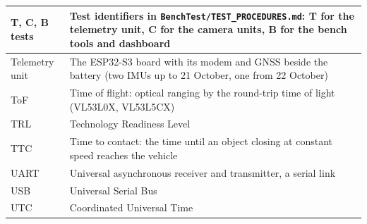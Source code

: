 \documentclass[a4paper,11pt]{report}
\begin{document}
{{\begin{longtable}{|>{\raggedright\arraybackslash}p{2.6cm}|>{\raggedright\arraybackslash}p{11.2cm}|}
T, C, B tests & Test identifiers in \texttt{BenchTest/\allowbreak{}TEST\_\allowbreak{}PROCEDURES.md}: T for the telemetry unit, C for the camera units, B for the bench tools and dashboard \\ \hline
Telemetry unit & The ESP32-S3 board with its modem and GNSS beside the battery (two IMUs up to 21 October, one from 22 October) \\ \hline
ToF & Time of flight: optical ranging by the round-trip time of light (VL53L0X, VL53L5CX) \\ \hline
TRL & Technology Readiness Level \\ \hline
TTC & Time to contact: the time until an object closing at constant speed reaches the vehicle \\ \hline
UART & Universal asynchronous receiver and transmitter, a serial link \\ \hline
USB & Universal Serial Bus \\ \hline
UTC & Coordinated Universal Time \\ \hline
\end{longtable}
}

\newpage
\listoffigures

\newpage
\listoftables

\newpage
\fancyhead[RE,LO]{}
\fancyhead[LE]{\leftmark}
\fancyhead[RO]{\rightmark}
\pagestyle{fancy}











\appendix











}
\end{document}
